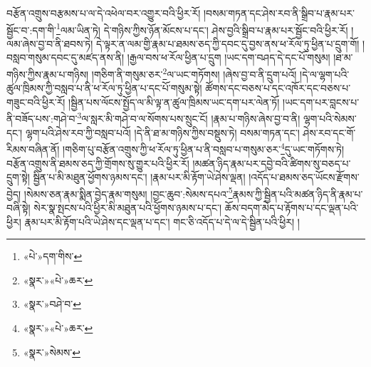 བརྩོན་འགྲུས་བརྩམས་པ་ལ་དེ་འཕེལ་བར་འགྱུར་བའི་ཕྱིར་རོ། །བསམ་གཏན་དང་ཤེས་རབ་ནི་སྒྲིབ་པ་རྣམ་པར་སྦྱོང་བ་:དག་གི་\footnote{«པེ་»དག་གིས་}ལམ་ཡིན་ཏེ། དེ་གཉིས་ཀྱིས་ཉོན་མོངས་པ་དང་། ཤེས་བྱའི་སྒྲིབ་པ་རྣམ་པར་སྦྱོང་བའི་ཕྱིར་རོ། །ལམ་ཞེས་བྱ་བ་ནི་ཐབས་ཏེ། དེ་ལྟར་ན་ལམ་གྱི་རྣམ་པ་ཐམས་ཅད་ཀྱི་དབང་དུ་བྱས་ནས་ཕ་རོལ་ཏུ་ཕྱིན་པ་དྲུག་གོ། །བསླབ་གསུམ་དབང་དུ་མཛད་ནས་ནི། །རྒྱལ་བས་ཕ་རོལ་ཕྱིན་པ་དྲུག །ཡང་དག་བཤད་དེ་དང་པོ་གསུམ། །ཐ་མ་གཉིས་ཀྱིས་རྣམ་པ་གཉིས། །གཅིག་ནི་གསུམ་ཅར་\footnote{«སྣར་»«པེ་»ཆར་}ལ་ཡང་གཏོགས། །ཞེས་བྱ་བ་ནི་དྲུག་པའོ། །དེ་ལ་ལྷག་པའི་ཚུལ་ཁྲིམས་ཀྱི་བསླབ་པ་ནི་ཕ་རོལ་ཏུ་ཕྱིན་པ་དང་པོ་གསུམ་སྟེ། ཚོགས་དང་བཅས་པ་དང་འཁོར་དང་བཅས་པ་གཟུང་བའི་ཕྱིར་རོ། །སྦྱིན་པས་ལོངས་སྤྱོད་ལ་མི་ལྟ་ན་ཚུལ་ཁྲིམས་ཡང་དག་པར་ལེན་ཏོ། །ཡང་དག་པར་བླངས་པ་ནི་བཟོད་པས་:གཤེ་བ་\footnote{«སྣར་»བཤེ་བ་}ལ་སླར་མི་གཤེ་བ་ལ་སོགས་པས་སྲུང་ངོ། །རྣམ་པ་གཉིས་ཞེས་བྱ་བ་ནི། ལྷག་པའི་སེམས་དང་། ལྷག་པའི་ཤེས་རབ་ཀྱི་བསླབ་པའོ། །དེ་ནི་ཐ་མ་གཉིས་ཀྱིས་བསྡུས་ཏེ། བསམ་གཏན་དང་། ཤེས་རབ་དང་གོ་རིམས་བཞིན་ནོ། །གཅིག་པུ་བརྩོན་འགྲུས་ཀྱི་ཕ་རོལ་ཏུ་ཕྱིན་པ་ནི་བསླབ་པ་གསུམ་ཅར་\footnote{«སྣར་»«པེ་»ཆར་}དུ་ཡང་གཏོགས་ཏེ། བརྩོན་འགྲུས་ནི་ཐམས་ཅད་ཀྱི་གྲོགས་སུ་གྱུར་པའི་ཕྱིར་རོ། །མཚན་ཉིད་རྣམ་པར་དབྱེ་བའི་ཚིགས་སུ་བཅད་པ་དྲུག་སྟེ། སྦྱིན་པ་མི་མཐུན་ཕྱོགས་ཉམས་དང་། །རྣམ་པར་མི་རྟོག་ཡེ་ཤེས་ལྡན། །འདོད་པ་ཐམས་ཅད་ཡོངས་རྫོགས་བྱེད། །སེམས་ཅན་རྣམ་སྨིན་བྱེད་རྣམ་གསུམ། །བྱང་ཆུབ་:སེམས་དཔའ་\footnote{«སྣར་»སེམས་}རྣམས་ཀྱི་སྦྱིན་པའི་མཚན་ཉིད་ནི་རྣམ་པ་བཞི་སྟེ། སེར་སྣ་སྤངས་པའི་ཕྱིར་མི་མཐུན་པའི་ཕྱོགས་ཉམས་པ་དང་། ཆོས་བདག་མེད་པ་རྟོགས་པ་དང་ལྡན་པའི་ཕྱིར། རྣམ་པར་མི་རྟོག་པའི་ཡེ་ཤེས་དང་ལྡན་པ་དང་། གང་ཅི་འདོད་པ་དེ་ལ་དེ་སྦྱིན་པའི་ཕྱིར། །
